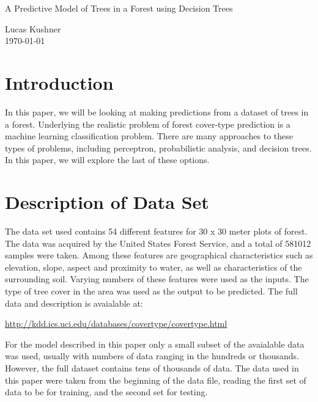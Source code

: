 \documentclass{article}
\begin{document}
	\begin{titlepage}
		\vspace*{\fill}
		\begin{center}
			\huge{A Predictive Model of Trees in a Forest using Decision Trees} \\
			\vspace{3cm}
			
			\large{Lucas Kushner} \\
			\vspace{10px}
			\normalsize{\today}		
		\end{center}
		\vspace*{\fill}
	\end{titlepage}	
	
	\doublespacing		
	
	\tableofcontents
	
	\clearpage
	\setcounter{page}{1}
	
	\section{Introduction}
	In this paper, we will be looking at making predictions from a dataset of trees in a forest. Underlying the realistic problem of forest cover-type prediction is a machine learning classification problem. There are many approaches to these types of problems, including perceptron, probabilistic analysis, and decision trees. In this paper, we will explore the last of these options.
	
	\section{Description of Data Set}
	The data set used contains 54 different features for 30 x 30 meter plots of forest. The data was acquired by the United States Forest Service, and a total of 581012 samples were taken. Among these features are geographical characteristics such as elevation, slope, aspect and proximity to water, as well as characteristics of the surrounding soil. Varying numbers of these features were used as the inputs. The type of tree cover in the area was used as the output to be predicted. The full data and description is avaialable at: 
	
	\begin{center} \url{http://kdd.ics.uci.edu/databases/covertype/covertype.html} \end{center}
	
	For the model described in this paper only a small subset of the avaialable data was used, usually with numbers of data ranging in the hundreds or thousands. However, the full dataset contains tens of thousands of data. The data used in this paper were taken from the beginning of the data file, reading the first set of data to be for training, and the second set for testing.
	
\end{document}
